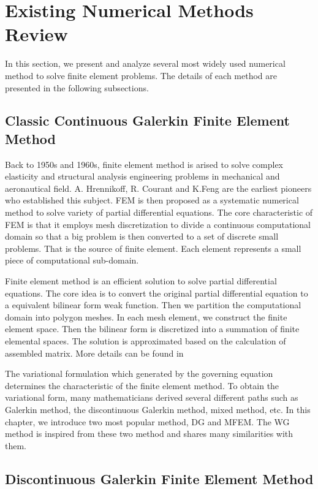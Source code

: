 \section{Existing Numerical Methods Review}
In this section, we present and analyze several most widely used numerical method to solve finite element problems. The details of each method are presented in the following subsections. 
\subsection{Classic Continuous Galerkin Finite Element Method}
Back to 1950s and 1960s, finite element method is arised to solve complex elasticity and structural analysis engineering problems in mechanical and aeronautical field. A. Hrennikoff\cite{hrennikoff1941solution}, R. Courant\cite{courant1994variational} and K.Feng are the earliest pioneers who established this subject. FEM is then proposed as a systematic numerical method to solve variety of partial differential equations. The core characteristic of FEM is that it employs mesh discretization to divide a continuous computational domain so that a big problem is then converted to a set of discrete small problems. That is the source of finite element. Each element represents a small piece of computational sub-domain.

Finite element method is an efficient solution to solve partial differential equations. The core idea is to convert the original partial differential equation to a equivalent bilinear form weak function. Then we partition the computational domain into polygon meshes. In each mesh element, we construct the finite element space. Then the bilinear form is discretized into a summation of finite elemental spaces. The solution is approximated based on the calculation of assembled matrix. More details can be found in \cite{zienkiewicz1977finite, ciarlet2002finite, hughes2012finite, reddy1993introduction}

The variational formulation which generated by the governing equation determines the characteristic of the finite element method. To obtain the variational form, many mathematicians derived several different paths such as Galerkin method, the discontinuous Galerkin method, mixed method, etc. In this chapter, we introduce two most popular method, DG and MFEM. The WG method is inspired from these two method and shares many similarities with them. 

\subsection{Discontinuous Galerkin Finite Element Method}

